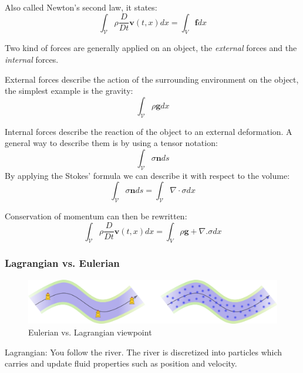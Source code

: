 Also called Newton's second law, it states:
\begin{equation}
\label{eq:momentumConservation}
\int_{\mathcal{V}} \rho \frac{D}{Dt} \mathbf{v}(t,x) dx = \int_{V} \mathbf{f} dx
\end{equation}

Two kind of forces are generally applied on an object, the \emph{external} forces and the \emph{internal} forces.

External forces describe the action of the surrounding environment on the object, the simplest example is the gravity:
\begin{equation}
\int_{\mathcal{V}} \rho \mathbf{g} dx
\end{equation}

Internal forces describe the reaction of the object to an external deformation. A general way to describe them is by using a tensor notation:
\begin{equation}
\int_{\mathcal{V}} \sigma \mathbf{n} ds
\end{equation}
By applying the Stokes' formula we can describe it with respect to the volume:
\begin{equation}
\int_{\mathcal{V}} \sigma \mathbf{n} ds =
\int_{\mathcal{V}} \nabla \cdot \sigma dx
\end{equation}

Conservation of momentum can then be rewritten:
\begin{equation}
\int_{\mathcal{V}} \rho \frac{D}{Dt} \mathbf{v}(t,x) dx = \int_{V} \rho \mathbf{g} + \nabla. \sigma dx
\end{equation}

\subsubsection{Lagrangian vs. Eulerian}

\begin{figure}[!ht]
\centering
\includegraphics[scale=0.5]{images/continuum_mechanics/eulerianVsLagrangian.png}
\caption[STAR mechanics: Eulerian vs. Lagrangian]{\label{fig:eulerianVsLagrangian} Eulerian vs. Lagrangian viewpoint}
\end{figure}

Lagrangian: You follow the river. The river is discretized into particles which carries and update fluid properties such as position and velocity. 

